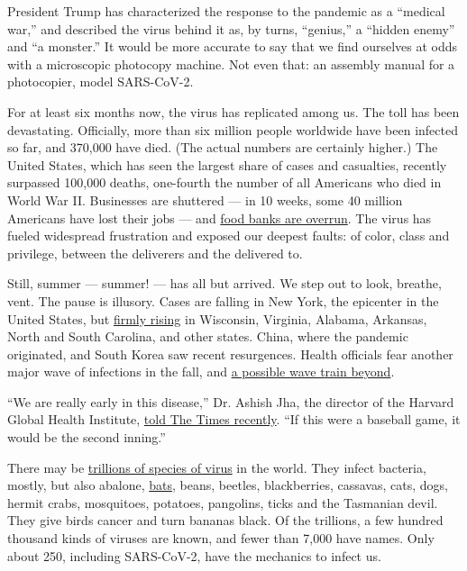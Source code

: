 President Trump has characterized the response to the pandemic as a
``medical war,'' and described the virus behind it as, by turns,
``genius,'' a ``hidden enemy'' and ``a monster.'' It would be more
accurate to say that we find ourselves at odds with a microscopic
photocopy machine. Not even that: an assembly manual for a photocopier,
model SARS-CoV-2.

For at least six months now, the virus has replicated among us. The toll
has been devastating. Officially, more than six million people worldwide
have been infected so far, and 370,000 have died. (The actual numbers
are certainly higher.) The United States, which has seen the largest
share of cases and casualties, recently surpassed 100,000 deaths,
one-fourth the number of all Americans who died in World War II.
Businesses are shuttered --- in 10 weeks, some 40 million Americans have
lost their jobs --- and
\href{https://www.nytimes3xbfgragh.onion/2020/04/08/business/economy/coronavirus-food-banks.html}{food
banks are overrun}. The virus has fueled widespread frustration and
exposed our deepest faults: of color, class and privilege, between the
deliverers and the delivered to.

Still, summer --- summer! --- has all but arrived. We step out to look,
breathe, vent. The pause is illusory. Cases are falling in New York, the
epicenter in the United States, but
\href{https://www.nytimes3xbfgragh.onion/interactive/2020/us/coronavirus-us-cases.html?action=click\&pgtype=Article\&state=default\&module=styln-coronavirus-markets\&variant=show\&region=TOP_BANNER\&context=storylines_menu\#states}{firmly
rising} in Wisconsin, Virginia, Alabama, Arkansas, North and South
Carolina, and other states. China, where the pandemic originated, and
South Korea saw recent resurgences. Health officials fear another major
wave of infections in the fall, and
\href{https://www.nytimes3xbfgragh.onion/2020/05/08/health/coronavirus-pandemic-curve-scenarios.html}{a
possible wave train beyond}.

``We are really early in this disease,'' Dr. Ashish Jha, the director of
the Harvard Global Health Institute,
\href{https://www.nytimes3xbfgragh.onion/2020/05/03/world/asia/coronavirus-spread-where-why.html?campaign_id=9\&emc=edit_nn_20200504\&instance_id=18202\&nl=the-morning\&regi_id=102543212\&segment_id=26556\&te=1\&user_id=11229ce0c34ff5caaf09af6410292613}{told
The Times recently}. ``If this were a baseball game, it would be the
second inning.''

There may be
\href{https://www.nytimes3xbfgragh.onion/2020/03/24/science/viruses-coranavirus-biology.html}{trillions
of species of virus} in the world. They infect bacteria, mostly, but
also abalone,
\href{https://www.nytimes3xbfgragh.onion/2020/01/28/science/bats-coronavirus-Wuhan.html}{bats},
beans, beetles, blackberries, cassavas, cats, dogs, hermit crabs,
mosquitoes, potatoes, pangolins, ticks and the Tasmanian devil. They
give birds cancer and turn bananas black. Of the trillions, a few
hundred thousand kinds of viruses are known, and fewer than 7,000 have
names. Only about 250, including SARS-CoV-2, have the mechanics to
infect us.

